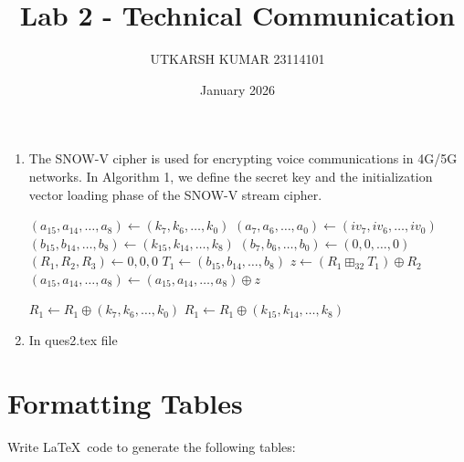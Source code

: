 \documentclass{article}
\title{Lab 2 - Technical Communication}
\author{UTKARSH KUMAR 23114101}
\date{January 2026}
\begin{document}
\maketitle

\begin{enumerate}
    \item 
    
The SNOW-V cipher is used for encrypting voice communications in 4G/5G networks. In Algorithm 1, we define the secret key and the initialization vector loading phase of the SNOW-V stream cipher.

\begin{algorithm}
\caption{The key and IV setup phase}

\begin{algorithmic}[1]
    \State $(a_{15},a_{14},\ldots,a_{8}) \gets (k_{7},k_{6},\ldots,k_{0})$ 
    \State $(a_{7},a_{6},\ldots,a_{0}) \gets (iv_{7},iv_{6},\ldots,iv_{0})$ 
    \State $(b_{15},b_{14},\ldots,b_{8}) \gets (k_{15},k_{14},\ldots,k_{8})$
    \State $(b_{7},b_{6},\ldots,b_{0}) \gets (0,0,\ldots,0)$
    \State $(R_{1},R_{2},R_{3}) \gets 0,0,0$
    \State $T_1 \gets (b_{15},b_{14},\ldots,b_{8})$
    \State $z \gets (R_1 \boxplus_{32} T_1) \oplus R_2$
    \State {}
    \State {}
    \State $(a_{15},a_{14},\ldots,a_{8}) \gets (a_{15},a_{14},\ldots,a_{8}) \oplus z$

        \State $R_1 \gets R_1 \oplus (k_{7},k_{6},\ldots,k_{0})$
    \EndIf
        \State $R_1 \gets R_1 \oplus (k_{15},k_{14},\ldots,k_{8})$
    \EndIf
    \EndFor
\EndProcedure
\end{algorithmic}
\end{algorithm}

\item In ques2.tex file
\end{enumerate}

\newpage
\section{Formatting Tables} 

Write \LaTeX \ code to generate the following tables:
\end{document}
